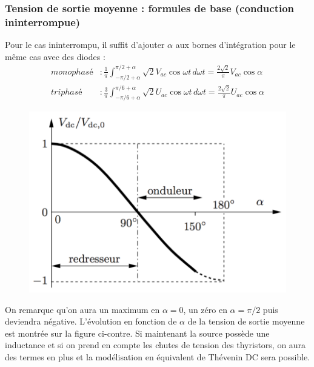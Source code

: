 				\subsubsection{Tension de sortie moyenne : formules de base (conduction ininterrompue)}
					Pour le cas ininterrompu, il suffit d'ajouter $\alpha$ aux bornes d'intégration pour le même cas avec des diodes :				
					\begin{equation}
					\begin{aligned}
					monophasé &: \frac{1}{\pi} \int _{-\pi /2+\alpha}^{\pi /2 +\alpha} \sqrt{2}V_{ac}\cos\omega t\, d\omega t = \frac{2\sqrt{2}	}{\pi} V_{ac}\cos \alpha \\
					triphasé &: \frac{3}{\pi} \int _{-\pi /6+\alpha}^{\pi /6 +\alpha} \sqrt{2}U_{ac}\cos\omega t\, d\omega t = \frac{2\sqrt{2}	}{\pi} U_{ac}\cos \alpha
					\end{aligned}
					\end{equation}
		
					\begin{figure}
					\vspace{-5mm}
					\includegraphics[scale=0.3]{ch3/8}
					\end{figure}
					On remarque qu'on aura un maximum en $\alpha = 0$, un zéro en $\alpha = \pi /2$ puis deviendra négative. L'évolution en fonction de $\alpha$ de la tension de sortie moyenne est montrée sur la figure ci-contre. Si maintenant la source possède une inductance et si on prend en compte les chutes de tension des thyristors, on aura des termes en plus et la modélisation en équivalent de Thévenin DC sera possible. 
					

